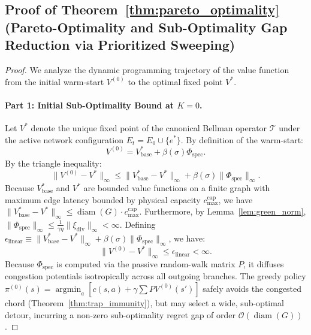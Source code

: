 \documentclass[11pt,a4paper]{article}
\begin{document}
\subsection{Proof of Theorem~\ref{thm:pareto_optimality} (Pareto-Optimality and Sub-Optimality Gap Reduction via Prioritized Sweeping)}
\label{subsec:proof_pareto}

\begin{proof}
We analyze the dynamic programming trajectory of the value function from the initial warm-start $V^{(0)}$ to the optimal fixed point $V^*$.

\paragraph{Part 1: Initial Sub-Optimality Bound at $K = 0$.}
Let $V^*$ denote the unique fixed point of the canonical Bellman operator $\mathcal{T}$ under the active network configuration $E_t = E_0 \cup \{e^*\}$. By definition of the warm-start:
\begin{equation}
V^{(0)} = V_{\text{base}}^* + \beta(\sigma) \Phi_{\text{spec}}.
\end{equation}
By the triangle inequality:
\begin{equation}
\|V^{(0)} - V^*\|_\infty \le \|V_{\text{base}}^* - V^*\|_\infty + \beta(\sigma) \|\Phi_{\text{spec}}\|_\infty.
\end{equation}
Because $V_{\text{base}}^*$ and $V^*$ are bounded value functions on a finite graph with maximum edge latency bounded by physical capacity $c_{\max}^{\text{cap}}$, we have $\|V_{\text{base}}^* - V^*\|_\infty \le \operatorname{diam}(G) \cdot c_{\max}^{\text{cap}}$. Furthermore, by Lemma~\ref{lem:green_norm}, $\|\Phi_{\text{spec}}\|_\infty \le \frac{1}{\gamma \eta} \|\xi_{\text{div}}\|_\infty < \infty$. Defining $\epsilon_{\text{linear}} \equiv \|V_{\text{base}}^* - V^*\|_\infty + \beta(\sigma) \|\Phi_{\text{spec}}\|_\infty$, we have:
\begin{equation}
\|V^{(0)} - V^*\|_\infty \le \epsilon_{\text{linear}} < \infty.
\end{equation}
Because $\Phi_{\text{spec}}$ is computed via the passive random-walk matrix $P$, it diffuses congestion potentials isotropically across all outgoing branches. The greedy policy $\pi^{(0)}(s) = \operatorname{argmin}_a [ c(s, a) + \gamma \sum P V^{(0)}(s') ]$ safely avoids the congested chord (Theorem~\ref{thm:trap_immunity}), but may select a wide, sub-optimal detour, incurring a non-zero sub-optimality regret gap of order $\mathcal{O}(\operatorname{diam}(G))$.


\end{proof}
\end{document}

